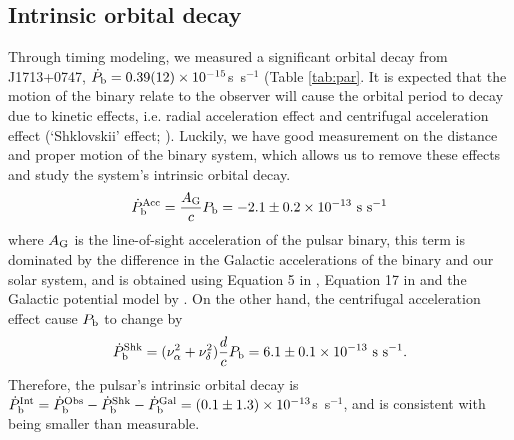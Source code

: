 \subsection{Intrinsic orbital decay}
\label{sec:obdecay}
Through timing modeling, we measured a significant orbital decay from
J1713+0747, $\dot{P}_{\rm b} = 0.39(12)\times10^{-15}$s~s$^{-1}$ (Table
\ref{tab:par}. 
It is expected that the motion of the binary relate to the observer will
cause the orbital period to decay due to kinetic effects, i.e. radial acceleration
effect \citep{dt91} and centrifugal acceleration effect (`Shklovskii' effect;
\citealt{shk70}). Luckily, we have good measurement on the distance and proper
motion of the binary system, which allows us to remove these effects and study the system's intrinsic orbital decay.
\begin{equation}
\dot{P}_{\rm b}^{\rm Acc} = \frac{A_{\rm G}}{c} P_{\rm b} =
-2.1\pm0.2\times10^{-13}~{\rm s~s^{-1}}
\end{equation}
where $A_{\rm G}$ is the line-of-sight acceleration of the pulsar binary,
this term is dominated by the difference in the Galactic accelerations of the
binary and our solar system, and is obtained using
Equation 5 in \citet{nt95}, Equation 17 in \citet{lwj+09} and the Galactic
potential model by \citet{hf04a}.
On the other hand, the centrifugal acceleration effect cause $P_{\rm b}$ to
change by
\begin{equation}
\dot{P}_{\rm b}^{\rm Shk} = (\nu_{\alpha}^2+\nu_{\delta}^2)\frac{d}{c}P_{\rm
b} = 6.1\pm0.1\times10^{-13}~{\rm s~s^{-1}}.
\end{equation}
Therefore, the pulsar's intrinsic orbital decay is $\dot{P}_{\rm b}^{\rm Int}
= \dot{P}_{\rm b}^{\rm Obs} - \dot{P}_{\rm b}^{\rm Shk} - \dot{P}_{\rm b}^{\rm
Gal} = (0.1\pm1.3)\times10^{-13}$s~s$^{-1}$, and is consistent with being smaller than measurable.

